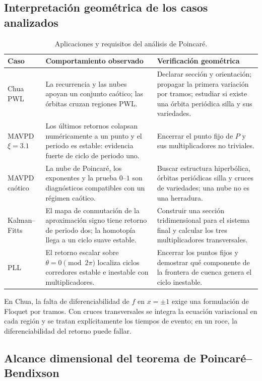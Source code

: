 \subsection{Interpretación geométrica de los casos analizados}

\begin{table}[H]
\centering
\caption{Aplicaciones y requisitos del análisis de Poincaré.}
\label{geo:tab:poincare-cases}
\small
\begin{tabularx}{\textwidth}{@{}L{0.17\textwidth}YY@{}}
\toprule
Caso & Comportamiento observado & Verificación geométrica \\
\midrule
Chua PWL & La recurrencia y las nubes apoyan un conjunto caótico; las órbitas
cruzan regiones PWL. & Declarar sección y orientación; propagar la primera
variación por tramos; estudiar si existe una órbita periódica silla y sus
variedades. \\
MAVPD \(\xi=3.1\) & Los últimos retornos colapsan numéricamente a un punto y el
periodo es estable: evidencia fuerte de ciclo de periodo uno. & Encerrar el
punto fijo de \(P\) y sus multiplicadores no triviales. \\
MAVPD caótico & La nube de Poincaré, los exponentes y la prueba \(0\)--\(1\)
son diagnósticos compatibles con un régimen caótico. & Buscar estructura hiperbólica,
órbitas periódicas silla y cruces de variedades; una nube no es una herradura.
\\
Kalman--Fitts & El mapa de conmutación de la aproximación signo tiene retorno
de periodo dos; la homotopía llega a un ciclo suave estable. & Construir una
sección tridimensional para el sistema final y calcular los tres
multiplicadores transversales. \\
PLL & El retorno escalar sobre \(\theta=0\pmod{2\pi}\) localiza ciclos
corredores estable e inestable con multiplicadores. & Encerrar los puntos
fijos y demostrar qué componente de la frontera de cuenca genera el ciclo
inestable. \\
\bottomrule
\end{tabularx}
\end{table}

En Chua, la falta de diferenciabilidad de \(f\) en \(x=\pm1\) exige una
formulación de Floquet por tramos. Con cruces transversales
se integra la ecuación variacional en cada región y se tratan explícitamente
los tiempos de evento; en un roce, la diferenciabilidad del retorno puede
fallar.

\subsection{Alcance dimensional del teorema de Poincaré--Bendixson}

